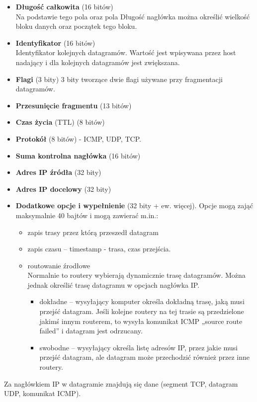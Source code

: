\documentclass[../main.tex]{subfiles}
\begin{document}
\begin{itemize}
        \item \textbf{Długość całkowita} (16 bitów)\\
        Na podstawie tego pola oraz pola Długość nagłówka można określić wielkość bloku danych oraz początek tego bloku.
        \item \textbf{Identyfikator} (16 bitów)\\
        Identyfikator kolejnych datagramów. Wartość jest wpisywana przez host nadający i dla kolejnych datagramów jest zwiększana.
        \item \textbf{Flagi} (3 bity)
        3 bity tworzące dwie flagi używane przy fragmentacji datagramów.
        \item \textbf{Przesunięcie fragmentu} (13 bitów)
        \item \textbf{Czas życia} (TTL) (8 bitów)
        \item \textbf{Protokół} (8 bitów) - ICMP, UDP, TCP.
        \item \textbf{Suma kontrolna nagłówka} (16 bitów)
        \item \textbf{Adres IP źródła} (32 bity)
        \item \textbf{Adres IP docelowy} (32 bity)
        \item \textbf{Dodatkowe opcje i wypełnienie} (32 bity + ew. więcej).
        Opcje mogą zająć maksymalnie 40 bajtów i mogą zawierać m.in.:
        \begin{itemize}
            \item zapis trasy przez którą przeszedł datagram
            \item zapis czasu – timestamp - trasa, czas przejścia.
            \item routowanie źrodłowe\\
            Normalnie to routery wybierają dynamicznie trasę datagramów. Można jednak określić trasę datagramu w opcjach nagłówka IP.
            \begin{itemize}
                \item  dokładne – wysyłający komputer określa dokładną trasę, jaką musi przejść datagram. Jeśli kolejne routery na tej trasie są przedzielone jakimś innym routerem, to wysyła komunikat ICMP „source route failed” i datagram jest odrzucany.
                \item swobodne – wysyłający określa listę adresów IP, przez jakie musi przejść datagram, ale datagram może przechodzić również przez inne routery.
            \end{itemize}
        \end{itemize}
    \end{itemize}
    Za nagłówkiem IP w datagramie znajdują się dane (segment TCP, datagram UDP, komunikat ICMP).
\end{document}
